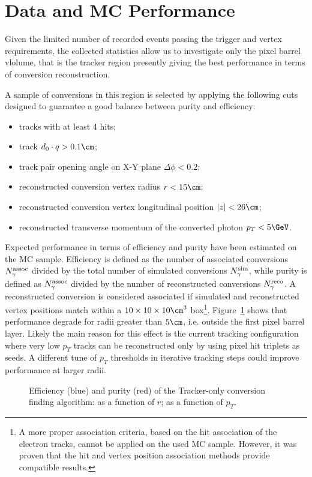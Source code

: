 \section{Data and MC Performance}
\label{dataVsMc}
Given the limited number of recorded events passing the trigger and
vertex requirements, the collected statistics allow us to investigate
only the pixel barrel vlolume, that is the tracker region presently
giving the best performance in terms of conversion reconstruction.

A sample of conversions in this region is selected by applying the
following cuts designed to guarantee a good balance between purity and
efficiency:
\begin{itemize}
\item tracks with at least 4 hits;
\item track $d_0\cdot q > 0.1\cm$;
\item track pair opening angle on X-Y plane $\Delta\phi<0.2$;
\item reconstructed conversion vertex radius $r<15\cm$;
\item reconstructed conversion vertex longitudinal position $|z|< 26\cm$;
\item reconstructed transverse momentum of the converted photon $p_T<5\GeV$.
\end{itemize}

Expected performance in terms of efficiency and purity have been
estimated on the MC sample.
Efficiency is defined as the number of associated conversions
$N^{\rm assoc}_{\gamma}$ divided by the total number of simulated
conversions $N^{\rm sim}_{\gamma}$, while purity is defined as
$N^{\rm assoc}_{\gamma}$ divided by the number of reconstructed
conversions $N^{\rm reco}_{\gamma}$.
A reconstructed conversion is considered associated if simulated and reconstructed vertex positions match within a $10\times10\times10\cm^3$ 
box\footnote{A more proper association criteria, based on the hit
  association of the electron tracks, cannot be applied on the used MC
  sample. However, it was proven that the hit and vertex position
  association methods provide compatible results.}.
Figure~\ref{efficpurity} shows that performance degrade for radii greater than $5\cm$, i.e. outside the first pixel barrel layer.
Likely the main reason for this effect is the current tracking configuration where very low $p_T$ tracks can be reconstructed only by using pixel hit triplets as seeds. A different tune of $p_T$ thresholds in iterative tracking steps  could improve performance at larger radii.
\begin{figure}[!hbtp]
\caption{Efficiency (blue) and purity (red) of the Tracker-only conversion finding algorithm:  as a function of $r$;  as a function of $p_T$.}
\label{efficpurity}
\end{figure}

